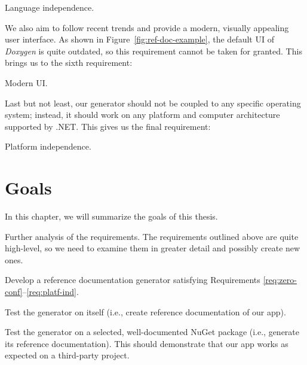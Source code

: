 \begin{requirement}
    Language independence.
    \label{req:lang-ind}
\end{requirement}

We also aim to follow recent trends and provide a modern, visually appealing user interface.
As shown in Figure~\ref{fig:ref-doc-example}, the default UI of \textit{Doxygen} is quite outdated,
so this requirement cannot be taken for granted.
This brings us to the sixth requirement:

\begin{requirement}
    Modern UI.
    \label{req:modern-ui}
\end{requirement}

Last but not least, our generator should not be coupled to any specific operating system; instead, 
it should work on any platform and computer architecture supported by .NET. 
This gives us the final requirement:

\begin{requirement}
    Platform independence.
    \label{req:platf-ind}
\end{requirement}

\section{Goals}
\label{sec:intro-goals}
In this chapter, we will summarize the goals of this thesis.

\begin{goal}
Further analysis of the requirements. The requirements outlined above are quite high-level, so we need to examine them in greater detail and possibly create new ones. \label{goal:first}
\end{goal}

\begin{goal}
    Develop a reference documentation generator satisfying Requirements \ref{req:zero-conf}--\ref{req:platf-ind}. 
    \label{goal:second}
\end{goal}

\begin{goal}
    Test the generator on itself (i.e., create reference documentation of our app).
    \label{goal:third}
\end{goal}

\begin{goal}
    Test the generator on a selected, well-documented NuGet package (i.e., generate its reference documentation). This should demonstrate that our app works as expected on a third-party project.
    \label{goal:fourth}
\end{goal}
